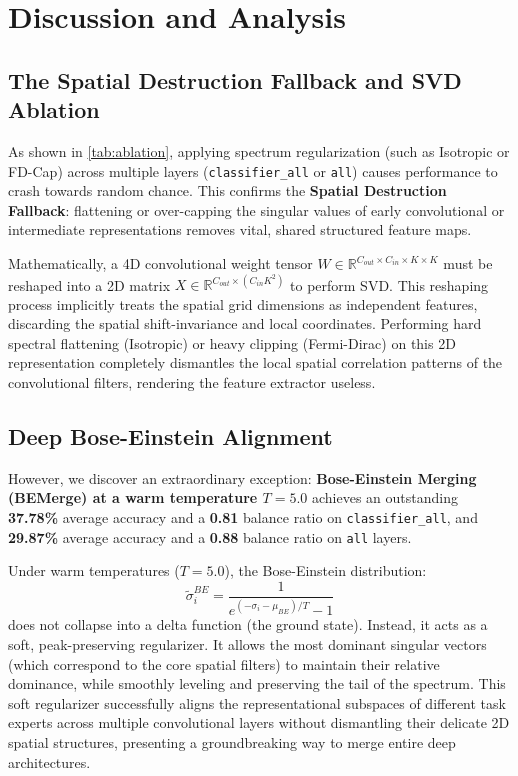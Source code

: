 \documentclass{article}
\theoremstyle{plain}
\theoremstyle{definition}
\theoremstyle{remark}
\begin{document}
\section{Discussion and Analysis}
\label{sec:discussion}

\subsection{The Spatial Destruction Fallback and SVD Ablation}
As shown in \cref{tab:ablation}, applying spectrum regularization (such as Isotropic or FD-Cap) across multiple layers (\texttt{classifier\_all} or \texttt{all}) causes performance to crash towards random chance. This confirms the \textbf{Spatial Destruction Fallback}: flattening or over-capping the singular values of early convolutional or intermediate representations removes vital, shared structured feature maps. 

Mathematically, a 4D convolutional weight tensor $W \in \mathbb{R}^{C_{out} \times C_{in} \times K \times K}$ must be reshaped into a 2D matrix $X \in \mathbb{R}^{C_{out} \times (C_{in} K^2)}$ to perform SVD. This reshaping process implicitly treats the spatial grid dimensions as independent features, discarding the spatial shift-invariance and local coordinates. Performing hard spectral flattening (Isotropic) or heavy clipping (Fermi-Dirac) on this 2D representation completely dismantles the local spatial correlation patterns of the convolutional filters, rendering the feature extractor useless.

\subsection{Deep Bose-Einstein Alignment}
However, we discover an extraordinary exception: \textbf{Bose-Einstein Merging (BEMerge) at a warm temperature $T=5.0$} achieves an outstanding \textbf{37.78\%} average accuracy and a \textbf{0.81} balance ratio on \texttt{classifier\_all}, and \textbf{29.87\%} average accuracy and a \textbf{0.88} balance ratio on \texttt{all} layers. 

Under warm temperatures ($T=5.0$), the Bose-Einstein distribution:
\begin{equation}
    \tilde{\sigma}_i^{BE} = \frac{1}{e^{(-\sigma_i - \mu_{BE})/T} - 1}
\end{equation}
does not collapse into a delta function (the ground state). Instead, it acts as a soft, peak-preserving regularizer. It allows the most dominant singular vectors (which correspond to the core spatial filters) to maintain their relative dominance, while smoothly leveling and preserving the tail of the spectrum. This soft regularizer successfully aligns the representational subspaces of different task experts across multiple convolutional layers without dismantling their delicate 2D spatial structures, presenting a groundbreaking way to merge entire deep architectures.
\end{document}
